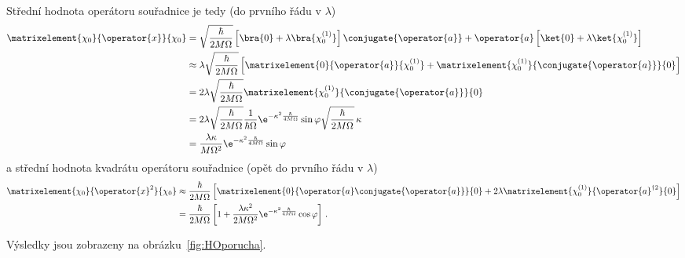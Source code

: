 \begin{solution}
\begin{enumerate}
\begin{align}
			\end{align}
			Střední hodnota operátoru souřadnice je tedy (do prvního řádu v $\lambda$)
			\begin{align}
				\matrixelement{\chi_{0}}{\operator{x}}{\chi_{0}}
					&=\sqrt{\frac{\hbar}{2M\Omega}}\left[\bra{0}+\lambda\bra{\chi_{0}^{(1)}}\right]\conjugate{\operator{a}}+\operator{a}\left[\ket{0}+\lambda\ket{\chi_{0}^{(1)}}\right]\nonumber\\
					&\approx\lambda\sqrt{\frac{\hbar}{2M\Omega}}\left[\matrixelement{0}{\operator{a}}{\chi_{0}^{(1)}}+\matrixelement{\chi_{0}^{(1)}}{\conjugate{\operator{a}}}{0}\right]\nonumber\\
					&=2\lambda\sqrt{\frac{\hbar}{2M\Omega}}\matrixelement{\chi_{0}^{(1)}}{\conjugate{\operator{a}}}{0}\nonumber\\
					&=2\lambda\sqrt{\frac{\hbar}{2M\Omega}}\frac{1}{\hbar\Omega}\e^{-\kappa^{2}\frac{\hbar}{4M\Omega}}\sin{\varphi}\sqrt{\frac{\hbar}{2M\Omega}}\,\kappa\nonumber\\
					&=\frac{\lambda\kappa}{M\Omega^{2}}\e^{-\kappa^{2}\frac{\hbar}{4M\Omega}}\sin{\varphi}
			\end{align}
			a střední hodnota kvadrátu operátoru souřadnice (opět do prvního řádu v $\lambda$)
			\begin{align}
				\matrixelement{\chi_{0}}{\operator{x}^{2}}{\chi_{0}}
					&\approx\frac{\hbar}{2M\Omega}\left[\matrixelement{0}{\operator{a}\conjugate{\operator{a}}}{0}+2\lambda\matrixelement{\chi_{0}^{(1)}}{\operator{a}^{\dagger 2}}{0}\right]\nonumber\\
					&=\frac{\hbar}{2M\Omega}\left[1+\frac{\lambda\kappa^{2}}{2M\Omega^{2}}\e^{-\kappa^{2}\frac{\hbar}{4M\Omega}}\cos{\varphi}\right]\,.
			\end{align}			

			Výsledky jsou zobrazeny na obrázku~\ref{fig:HOporucha}.
	\end{enumerate}
\end{solution}
